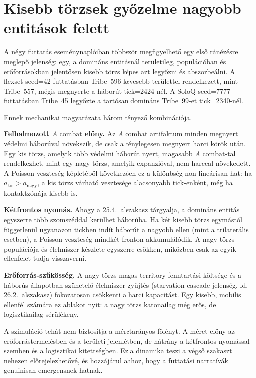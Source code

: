 \section{Kisebb törzsek győzelme nagyobb entitások felett}
\label{sec:neurosim-26-upset}

A négy futtatás eseménynaplóiban többször megfigyelhető egy első ránézésre
meglepő jelenség: egy, a domináns entitásnál területileg, populációban
és erőforrásokban jelentősen kisebb törzs képes azt legyőzni és abszorbeálni.
A flexset seed=42 futtatásban Tribe~596 kevesebb területtel rendelkezett, mint
Tribe~557, mégis megnyerte a háborút tick=2424-nél. A SoloQ seed=7777 futtatásban
Tribe~45 legyőzte a tartósan domináns Tribe~99-et tick=2340-nél.

Ennek mechanikai magyarázata három tényező kombinációja.

\textbf{Felhalmozott $A\_\text{combat}$ előny.} Az $A\_\text{combat}$ artifaktum minden megnyert
védelmi háborúval növekszik, de csak a ténylegesen megnyert harci körök után.
Egy kis törzs, amelyik több védelmi háborút nyert, magasabb $A\_\text{combat}$-tal
rendelkezhet, mint egy nagy törzs, amelyik expanzióval, nem harccal növekedett.
A Poisson-veszteség képletéből következően ez a különbség non-lineárisan hat:
ha $a_{\text{kis}} > a_{\text{nagy}}$, a kis törzs várható vesztesége alacsonyabb
tick-enként, még ha kontaktzónája kisebb is.

\textbf{Kétfrontos nyomás.} Ahogy a 25.4.~alszakasz tárgyalja, a domináns entitás
egyszerre több szomszéddal kerülhet háborúba. Ha két kisebb törzs egymástól
függetlenül ugyanazon tickben indít háborút a nagyobb ellen (mint a trilaterális
esetben), a Poisson-veszteség mindkét fronton akkumulálódik. A nagy törzs
populációja és élelmiszer-készlete egyszerre csökken, miközben csak az egyik
ellenfelet tudja visszaverni.

\textbf{Erőforrás-szűkösség.} A nagy törzs magas territory fenntartási költsége
és a háborús állapotban szünetelő élelmiszer-gyűjtés (starvation cascade jelenség,
ld. 26.2.~alszakasz) fokozatosan csökkenti a harci kapacitást. Egy kisebb, mobilis
ellenfél számára ez ablakot nyit: a nagy törzs katonailag még erős, de logisztikailag
sérülékeny.

A szimuláció tehát nem biztosítja a méretarányos fölényt. A méret
előny az erőforrástermelésben és a területi jelenlétben, de hátrány a
kétfrontos nyomással szemben és a logisztikai kitettségben. Ez a dinamika
teszi a végső szakaszt nehezen előrejelezhetővé, és hozzájárul ahhoz, hogy
a futtatási narratívák genuinisan emergensnek hatnak.

